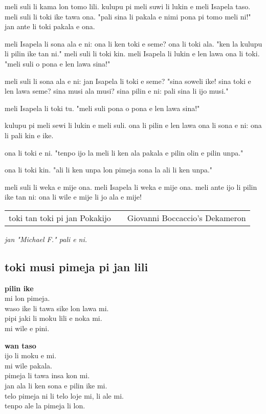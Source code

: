 meli suli li kama lon tomo lili.
kulupu pi meli suwi li lukin e meli Isapela taso.
meli suli li toki ike tawa ona.
"pali sina li pakala e nimi pona pi tomo meli ni!"
jan ante li toki pakala e ona.

meli Isapela li sona ala e ni: ona li ken toki e seme?
ona li toki ala.
"ken la kulupu li pilin ike tan ni."
meli suli li toki kin.
meli Isapela li lukin e len lawa ona li toki.
"meli suli o pona e len lawa sina!"

meli suli li sona ala e ni: jan Isapela li toki e seme?
"sina soweli ike!
sina toki e len lawa seme?
sina musi ala musi?
sina pilin e ni: pali sina li ijo musi."

meli Isapela li toki tu.
"meli suli pona o pona e len lawa sina!"

kulupu pi meli sewi li lukin e meli suli.
ona li pilin e len lawa ona li sona e ni: ona li pali kin e ike.

ona li toki e ni.
"tenpo ijo la meli li ken ala pakala e pilin olin e pilin unpa."

ona li toki kin.
"ali li ken unpa lon pimeja sona la ali li ken unpa."

meli suli li weka e mije ona.
meli Isapela li weka e mije ona.
meli ante ijo li pilin ike tan ni: ona li wile e mije li jo ala e mije!

\begin{supertabular}{p{5,5cm}|ll}
toki tan toki pi jan Pokakijo && Giovanni Boccaccio's Dekameron \\
\end{supertabular}

\textit{jan "Michael F." pali e ni. \cite{www:failbluedot:01}}
%
\subsection{toki musi pimeja pi jan lili}

\textbf{pilin ike} \\
mi lon pimeja.  \\
waso ike li tawa sike lon lawa mi.  \\
pipi jaki li moku lili e noka mi.  \\
mi wile e pini.  

\textbf{wan taso} \\
ijo li moku e mi.  \\
mi wile pakala.  \\
pimeja li tawa insa kon mi.  \\
jan ala li ken sona e pilin ike mi.  \\
telo pimeja ni li telo loje mi, li ale mi.  \\
tenpo ale la pimeja li lon. 


